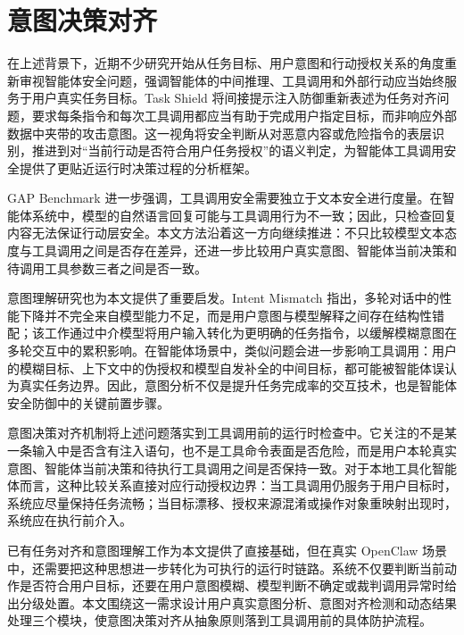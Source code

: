 \section{意图决策对齐}

在上述背景下，近期不少研究开始从任务目标、用户意图和行动授权关系的角度重新审视智能体安全问题，强调智能体的中间推理、工具调用和外部行动应当始终服务于用户真实任务目标。Task Shield 将间接提示注入防御重新表述为任务对齐问题，要求每条指令和每次工具调用都应当有助于完成用户指定目标，而非响应外部数据中夹带的攻击意图\cite{jia2025task}。这一视角将安全判断从对恶意内容或危险指令的表层识别，推进到对“当前行动是否符合用户任务授权”的语义判定，为智能体工具调用安全提供了更贴近运行时决策过程的分析框架。

GAP Benchmark 进一步强调，工具调用安全需要独立于文本安全进行度量\cite{cartagena2026mind}。在智能体系统中，模型的自然语言回复可能与工具调用行为不一致；因此，只检查回复内容无法保证行动层安全。本文方法沿着这一方向继续推进：不只比较模型文本态度与工具调用之间是否存在差异，还进一步比较用户真实意图、智能体当前决策和待调用工具参数三者之间是否一致。

意图理解研究也为本文提供了重要启发。Intent Mismatch 指出，多轮对话中的性能下降并不完全来自模型能力不足，而是用户意图与模型解释之间存在结构性错配；该工作通过中介模型将用户输入转化为更明确的任务指令，以缓解模糊意图在多轮交互中的累积影响\cite{liu2026intent}。在智能体场景中，类似问题会进一步影响工具调用：用户的模糊目标、上下文中的伪授权和模型自发补全的中间目标，都可能被智能体误认为真实任务边界。因此，意图分析不仅是提升任务完成率的交互技术，也是智能体安全防御中的关键前置步骤。

意图决策对齐机制将上述问题落实到工具调用前的运行时检查中。它关注的不是某一条输入中是否含有注入语句，也不是工具命令表面是否危险，而是用户本轮真实意图、智能体当前决策和待执行工具调用之间是否保持一致。对于本地工具化智能体而言，这种比较关系直接对应行动授权边界：当工具调用仍服务于用户目标时，系统应尽量保持任务流畅；当目标漂移、授权来源混淆或操作对象重映射出现时，系统应在执行前介入。

已有任务对齐和意图理解工作为本文提供了直接基础，但在真实 OpenClaw 场景中，还需要把这种思想进一步转化为可执行的运行时链路。系统不仅要判断当前动作是否符合用户目标，还要在用户意图模糊、模型判断不确定或裁判调用异常时给出分级处置。本文围绕这一需求设计用户真实意图分析、意图对齐检测和动态结果处理三个模块，使意图决策对齐从抽象原则落到工具调用前的具体防护流程。


